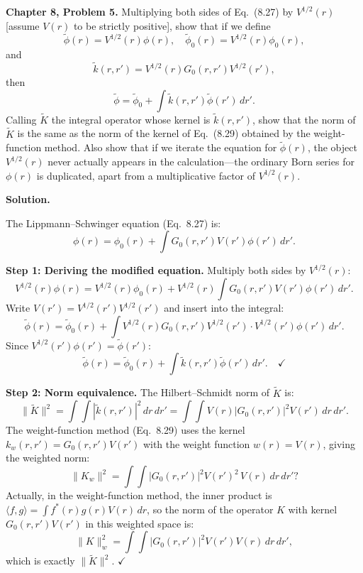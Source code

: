 \documentclass[12pt]{article}
\begin{document}
\textbf{Chapter 8, Problem 5.} Multiplying both sides of Eq.\ (8.27) by $V^{1/2}(r)$ [assume $V(r)$ to be strictly positive], show that if we define
\[
\tilde\phi(r) = V^{1/2}(r)\phi(r), \quad \tilde\phi_0(r) = V^{1/2}(r)\phi_0(r),
\]
and
\[
\tilde k(r,r') = V^{1/2}(r)G_0(r,r')V^{1/2}(r'),
\]
then
\[
\tilde\phi = \tilde\phi_0 + \int \tilde k(r,r')\tilde\phi(r')\,dr'.
\]
Calling $\tilde K$ the integral operator whose kernel is $\tilde k(r,r')$, show that the norm of $\tilde K$ is the same as the norm of the kernel of Eq.\ (8.29) obtained by the weight-function method. Also show that if we iterate the equation for $\tilde\phi(r)$, the object $V^{1/2}(r)$ never actually appears in the calculation---the ordinary Born series for $\phi(r)$ is duplicated, apart from a multiplicative factor of $V^{1/2}(r)$.

\bigskip
\textbf{Solution.}

The Lippmann--Schwinger equation (Eq.\ 8.27) is:
\[
\phi(r) = \phi_0(r) + \int G_0(r,r')V(r')\phi(r')\,dr'.
\]

\textbf{Step 1: Deriving the modified equation.}
Multiply both sides by $V^{1/2}(r)$:
\[
V^{1/2}(r)\phi(r) = V^{1/2}(r)\phi_0(r) + V^{1/2}(r)\int G_0(r,r')V(r')\phi(r')\,dr'.
\]
Write $V(r') = V^{1/2}(r')V^{1/2}(r')$ and insert into the integral:
\[
\tilde\phi(r) = \tilde\phi_0(r) + \int V^{1/2}(r)G_0(r,r')V^{1/2}(r')\cdot V^{1/2}(r')\phi(r')\,dr'.
\]
Since $V^{1/2}(r')\phi(r') = \tilde\phi(r')$:
\[
\boxed{\tilde\phi(r) = \tilde\phi_0(r) + \int \tilde k(r,r')\tilde\phi(r')\,dr'.} \quad\checkmark
\]

\textbf{Step 2: Norm equivalence.}
The Hilbert--Schmidt norm of $\tilde K$ is:
\[
\|\tilde K\|^2 = \int\!\!\int |\tilde k(r,r')|^2\,dr\,dr' = \int\!\!\int V(r)|G_0(r,r')|^2 V(r')\,dr\,dr'.
\]
The weight-function method (Eq.\ 8.29) uses the kernel $k_w(r,r') = G_0(r,r')V(r')$ with the weight function $w(r)=V(r)$, giving the weighted norm:
\[
\|K_w\|^2 = \int\!\!\int |G_0(r,r')|^2 V(r')^2\, V(r)\,dr\,dr'?
\]
Actually, in the weight-function method, the inner product is $\langle f,g\rangle = \int f^*(r)g(r)V(r)\,dr$, so the norm of the operator $K$ with kernel $G_0(r,r')V(r')$ in this weighted space is:
\[
\|K\|_w^2 = \int\!\!\int |G_0(r,r')|^2 V(r') V(r)\,dr\,dr',
\]
which is exactly $\|\tilde K\|^2$. $\checkmark$
\end{document}
